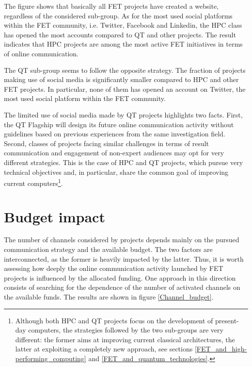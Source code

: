 The figure shows that basically all FET projects have created a website, regardless of the considered sub-group. As for the most used social platforms within the FET community, i.e. Twitter, Facebook and Linkedin, the HPC class has opened the most accounts compared to QT and other projects. The result indicates that HPC projects are among the most active FET initiatives in terms of online communication.  

The QT sub-group seems to follow the opposite strategy. The fraction of projects making use of social media is significantly smaller compared to HPC and other FET projects. In particular, none of them has opened an account on Twitter, the most used social platform within the FET community. 

The limited use of social media made by QT projects highlights two facts. First, the QT Flagship will design its future online communication activity without guidelines based on previous experiences from the same investigation field. Second, classes of projects facing similar challenges in terms of result communication and engagement of non-expert audiences may opt for very different strategies. This is the case of HPC and QT projects, which pursue very technical objectives and, in particular, share the common goal of improving current computers\footnote{Although both HPC and QT projects focus on the development of present-day computers, the strategies followed by the two sub-groups are very different: the former aims at improving current classical architectures, the latter at exploiting a completely new approach, see sections \ref{FET_and_high-performing_computing} and \ref{FET_and_quantum_technologies}.}.

\section{Budget impact} \label{Budget_impact}
The number of channels considered by projects depends mainly on the pursued communication strategy and the available budget. The two factors are interconnected, as the former is heavily impacted by the latter. Thus, it is worth assessing how deeply the online communication activity launched by FET projects is influenced by the allocated funding. One approach in this direction consists of searching for the dependence of the number of activated channels on the available funds. The results are shown in figure \ref{Channel_budget}.  

